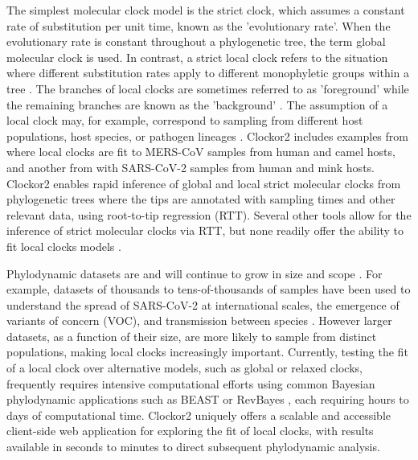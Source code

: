 \documentclass{article}
\begin{document}
The simplest molecular clock model is the strict clock, which assumes a constant rate of substitution per unit time, known as the 'evolutionary rate'. When the evolutionary rate is constant throughout a phylogenetic tree, the term global molecular clock is used. In contrast, a strict local clock refers to the situation where different substitution rates apply to different monophyletic groups within a tree \citep{ho2014molecular}. The branches of local clocks are sometimes referred to as 'foreground' while the remaining branches are known as the 'background' \citep{yoder2000estimation}. The assumption of a local clock may, for example, correspond to  sampling from different host populations, host species, or pathogen lineages \citep{worobey_synchronized_2014}. Clockor2 includes examples from \citet{dudas_mers-cov_2018} where local clocks are fit to MERS-CoV samples from human and camel hosts, and another from \citet{porter2023evolutionary} with SARS-CoV-2 samples from human and mink hosts. Clockor2 enables rapid inference of global and local strict molecular clocks from phylogenetic trees where the tips are annotated with sampling times and other relevant data, using root-to-tip regression (RTT). Several other tools allow for the inference of strict molecular clocks via RTT, but none readily offer the ability to fit local clocks models \citep{rambaut_exploring_2016, hadfield_nextstrain_2018,sagulenko_treetime_2018,volz_scalable_2017}. 

Phylodynamic datasets are and will continue to grow in size and scope \cite{featherstone2022epidemiological}. For example, datasets of thousands to tens-of-thousands of samples have been used to understand the spread of SARS-CoV-2 at international scales, the emergence of variants of concern (VOC), and transmission between species \citep{du_plessis_establishment_2021,hill_origins_2022,nadeau_swiss_2023,porter2023evolutionary}. However larger datasets, as a function of their size, are more likely to sample from distinct populations, making local clocks increasingly important. Currently, testing the fit of a local clock over alternative models, such as global or relaxed clocks, frequently requires intensive computational efforts using common Bayesian phylodynamic applications such as BEAST or RevBayes \citep{bouckaert_beast_2019, suchard_bayesian_2018, hoehna_2016_revbayes, drummond2007beast, drummond2012bayesian}, each requiring hours to days of computational time. Clockor2 uniquely offers a scalable and accessible client-side web application for exploring the fit of local clocks, with results available in seconds to minutes to direct subsequent phylodynamic analysis.
\end{document}
